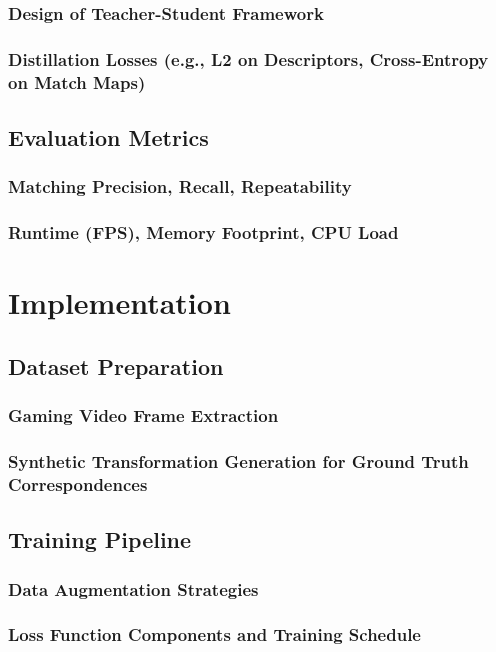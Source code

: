 \documentclass[a4paper,12pt]{report}
\begin{document}
\subsection{Design of Teacher-Student Framework}
\subsection{Distillation Losses (e.g., L2 on Descriptors, Cross-Entropy on Match Maps)}

\section{Evaluation Metrics}
\subsection{Matching Precision, Recall, Repeatability}
\subsection{Runtime (FPS), Memory Footprint, CPU Load}

\chapter{Implementation}
\section{Dataset Preparation}
\subsection{Gaming Video Frame Extraction}
\subsection{Synthetic Transformation Generation for Ground Truth Correspondences}

\section{Training Pipeline}
\subsection{Data Augmentation Strategies}
\subsection{Loss Function Components and Training Schedule}
\end{document}

